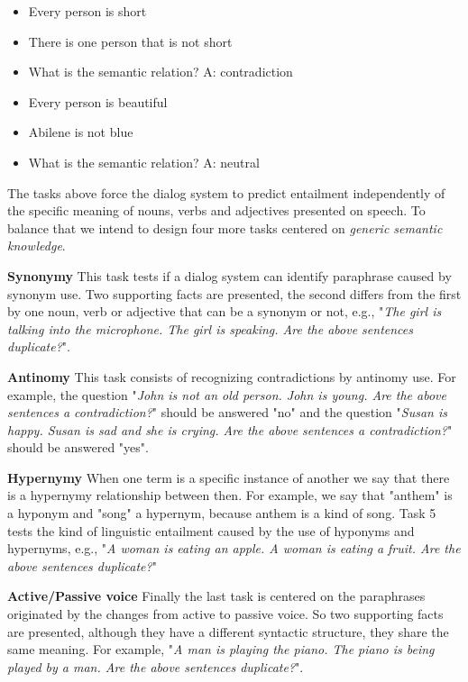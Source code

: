 \begin{itemize} 
\item[] Every person is short
\item[] There is one person that is not short
\item[] What is the semantic relation?  A: contradiction
\end{itemize}

\begin{itemize} 
\item[] Every person is beautiful
\item[] Abilene is not blue
\item[] What is the semantic relation? A: neutral
\end{itemize}


The tasks above force the dialog system to predict entailment independently of the specific meaning of nouns, verbs and adjectives presented on speech. To balance that we intend to design four more tasks centered on \textit{generic semantic knowledge}.

\textbf{Synonymy} This task tests if a dialog system can identify paraphrase caused by synonym use. Two supporting facts are presented, the second differs from the first by one noun, verb or adjective that can be a synonym or not, e.g., "\textit{The girl is talking into the microphone. The girl is speaking. Are the above sentences duplicate?}".   


\textbf{Antinomy} This task consists of recognizing contradictions by antinomy use. For example, the question "\textit{John is not an old person. John is young. Are the above sentences a contradiction?}" should be answered "no" and the question "\textit{Susan is happy. Susan is sad and she is crying. Are the above sentences a contradiction?}" should be answered "yes".

\textbf{Hypernymy} When one term is a specific instance of another we say that there is a hypernymy relationship between then. For example, we say that "anthem" is a hyponym and "song" a hypernym, because anthem is a kind of song. Task 5 tests the kind of linguistic entailment caused by the use of hyponyms and hypernyms, e.g., "\textit{A woman is eating an apple. A woman is eating a fruit. Are the above sentences duplicate?}"


\textbf{Active/Passive voice} Finally the last task is centered on the paraphrases originated by the changes from active to passive voice. So two supporting facts are presented, although they have a different syntactic structure, they share the same meaning. For example,  "\textit{A man is playing the piano. The piano is being played by a man. Are the above sentences duplicate?}".

